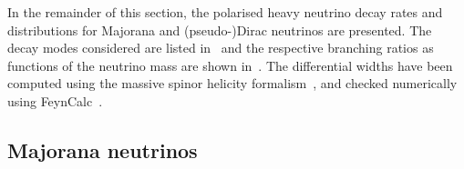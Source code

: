 In the remainder of this section, the polarised heavy neutrino decay rates and distributions %
for Majorana and (pseudo-)Dirac neutrinos are presented.
The decay modes considered are listed in~ and the respective branching ratios as functions of %
the neutrino mass are shown in~.
The differential widths have been computed using the massive spinor helicity formalism~\cite{Dittmaier:1998nn, Diaz-Cruz:2016ahc}, %
and checked numerically using FeynCalc~\cite{Shtabovenko:2016sxi,Mertig:1990an}.



\subsection{Majorana neutrinos}
\label{sec:decay_majorana}


